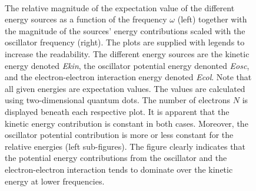\captionsetup[subfloat]{labelformat=empty}
\begin{figure}[h]
 \begin{center}
   \\
  \caption{The relative magnitude of the expectation value of the different energy sources as a function of the frequency $\omega$ (left) together with the magnitude of the sources' energy contributions scaled with the oscillator frequency (right). The plots are supplied with legends to increase the readability. The different energy sources are the kinetic energy denoted \textit{Ekin}, the oscillator potential energy denonted \textit{Eosc}, and the electron-electron interaction energy denoted \textit{Ecol}. Note that all given energies are expectation values. The values are calculated using two-dimensional quantum dots. The number of electrons $N$ is displayed beneath each respective plot. It is apparent that the kinetic energy contribution is constant in both cases. Moreover, the oscillator potential contribution is more or less constant for the relative energies (left sub-figures). The figure clearly indicates that the potential energy contributions from the oscillator and the electron-electron interaction tends to dominate over the kinetic energy at lower frequencies.}

\end{center}
\end{figure}
